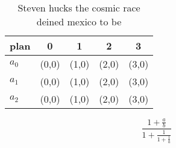 \documentclass[a4paper]{article}
\begin{document}
\begin{table}
\begin{adjustbox}{width=0.6\columnwidth}
\begin{tabular}{|l|l|l|l|l|}
\hline
\textbf{plan} & \multicolumn{1}{c|}{\textbf{0}} & \multicolumn{1}{c|}{\textbf{1}} & \multicolumn{1}{c|}{\textbf{2}} & \multicolumn{1}{c|}{\textbf{3}} \\ \hline
\textbf{$a_0$}  & (0,0) & (1,0) & (2,0) & (3,0) \\ \hline
\textbf{$a_1$}  & (0,0) & (1,0) & (2,0) & (3,0) \\ \hline
\textbf{$a_2$}  & (0,0) & (1,0) & (2,0) & (3,0) \\ \hline
\end{tabular}
\end{adjustbox}
\caption{Steven hucks the cosmic race deined mexico to be 
}
\end{table}

\[ \frac{1+\frac{a}{b}}{1+\frac{1}{1+\frac{1}{a}}} \]
\end{document}
